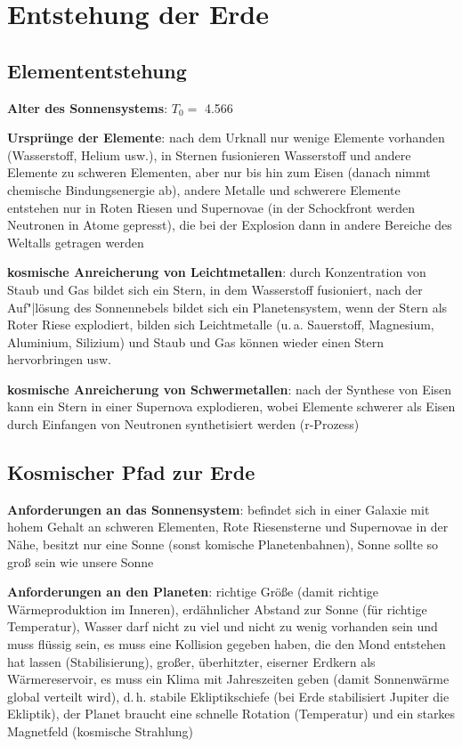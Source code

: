 \chapter{%
    Entstehung der Erde%
}

\section{%
    Elemententstehung%
}

\textbf{Alter des Sonnensystems}:
$T_0 =$ \SI{4.566}{\giga\year}

\textbf{Ursprünge der Elemente}:
nach dem Urknall nur wenige Elemente vorhanden (Wasserstoff, Helium usw.),
in Sternen fusionieren Wasserstoff und andere Elemente zu schweren Elementen,
aber nur bis hin zum Eisen (danach nimmt chemische Bindungsenergie ab),
andere Metalle und schwerere Elemente entstehen nur in Roten Riesen und Supernovae
(in der Schockfront werden Neutronen in Atome gepresst),
die bei der Explosion dann in andere Bereiche des Weltalls getragen werden

\textbf{kosmische Anreicherung von Leichtmetallen}:
durch Konzentration von Staub und Gas bildet sich ein Stern,
in dem Wasserstoff fusioniert,
nach der Auf"|lösung des Sonnennebels bildet sich ein Planetensystem,
wenn der Stern als Roter Riese explodiert, bilden sich Leichtmetalle
(u.\,a. Sauerstoff, Magnesium, Aluminium, Silizium)
und Staub und Gas können wieder einen Stern hervorbringen usw.

\textbf{kosmische Anreicherung von Schwermetallen}:
nach der Synthese von Eisen kann ein Stern in einer Supernova explodieren,
wobei Elemente schwerer als Eisen durch Einfangen von Neutronen synthetisiert werden
(r-Prozess)

\section{%
    Kosmischer Pfad zur Erde%
}

\textbf{Anforderungen an das Sonnensystem}:
befindet sich in einer Galaxie mit hohem Gehalt an schweren Elementen,
Rote Riesensterne und Supernovae in der Nähe,
besitzt nur eine Sonne (sonst komische Planetenbahnen),
Sonne sollte so groß sein wie unsere Sonne

\textbf{Anforderungen an den Planeten}:
richtige Größe (damit richtige Wärmeproduktion im Inneren),
erdähnlicher Abstand zur Sonne (für richtige Temperatur),
Wasser darf nicht zu viel und nicht zu wenig vorhanden sein und muss flüssig sein,
es muss eine Kollision gegeben haben, die den Mond entstehen hat lassen (Stabilisierung),
großer, überhitzter, eiserner Erdkern als Wärmereservoir,
es muss ein Klima mit Jahreszeiten geben
(damit Sonnenwärme global verteilt wird),
d.\,h. stabile Ekliptikschiefe (bei Erde stabilisiert Jupiter die Ekliptik),
der Planet braucht eine schnelle Rotation (Temperatur)
und ein starkes Magnetfeld (kosmische Strahlung)

\pagebreak
